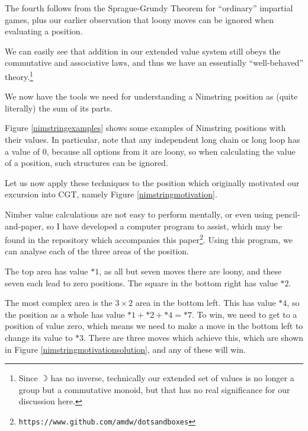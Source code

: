\documentclass[a4paper,twocolumn]{article}
\newcommand{\loony}{\rightmoon}
\begin{document}
The fourth follows from the Sprague-Grundy Theorem for ``ordinary''
impartial games, plus our earlier observation that loony moves can be
ignored when evaluating a position.

We can easily see that addition in our extended value system still
obeys the commutative and associative laws, and thus we have an
essentially ``well-behaved'' theory.\footnote{Since $\loony$ has no
  inverse, technically our extended set of values is no longer a group
  but a commutative monoid, but that has no real significance for our
  discussion here.}

We now have the tools we need for understanding a Nimstring position
as (quite literally) the sum of its parts.

Figure \ref{nimstringexamples} shows some examples of Nimstring
positions with their values. In particular, note that any independent
long chain or long loop has a value of $0$, because all options from
it are loony, so when calculating the value of a position, such
structures can be ignored.

\begin{figure*}
  \centering
  \def\svgscale{0.7}
  
  \caption{Examples of simple Nimstring values}
  \label{nimstringexamples}
\end{figure*}

Let us now apply these techniques to the position which originally
motivated our excursion into CGT, namely Figure
\ref{nimstringmotivation}.

Nimber value calculations are not easy to perform mentally, or even
using pencil-and-paper, so I have developed a computer program to
assist, which may be found in the repository which accompanies this
paper\footnote{\texttt{https://www.github.com/amdw/dotsandboxes}}. Using
this program, we can analyse each of the three areas of the position.

The top area has value $*1$, as all but seven moves there are loony,
and these seven each lead to zero positions. The square in the bottom
right has value $*2$.

The most complex area is the $3 \times 2$ area in the bottom
left. This has value $*4$, so the position as a whole has value $*1 +
*2 + *4 = *7$. To win, we need to get to a position of value zero,
which means we need to make a move in the bottom left to change its
value to $*3$. There are three moves which achieve this, which are
shown in Figure \ref{nimstringmotivationsolution}, and any of these
will win.
\end{document}
